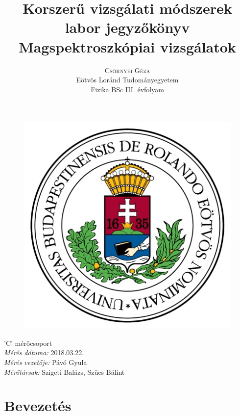 \documentclass[12pt,a4paper]{article}
\title{\huge{Korszerű vizsgálati módszerek labor jegyzőkönyv}\\ \vspace{20pt}
\textbf{Magspektroszkópiai vizsgálatok} \\}
\author{\Large{\textsc{Csörnyei Géza}} \vspace{10pt}\\
	\textrm{Eötvös Loránd Tudományegyetem}\\
	\textrm{Fizika BSc III. évfolyam}
	}
\date{}
\begin{document}
\addtolength{\voffset}{-1.5cm}
\addtolength{\textheight}{1.5cm}
\begin{titlepage}
\maketitle

\begin{figure}[!htb]
\centering
  \includegraphics[scale=0.6]{eltecimer.jpg}
\end{figure}

\hfil \Large{'C' mérőcsoport}\hfil  \\
\vspace*{2pt}
\hfil \Large{\emph{Mérés dátuma:} 2018.03.22.}\hfil \\
\vspace*{2pt}
\hfil \Large{\emph{Mérés vezetője:} Pávó Gyula}\hfil \\
\vspace*{2pt}
\hfil \hspace*{45pt} \Large{\emph{Mérőtársak:} Szigeti Balázs, Szűcs Bálint}\hfil
\thispagestyle{empty}
\end{titlepage}


\section{Bevezetés}
\end{document}
